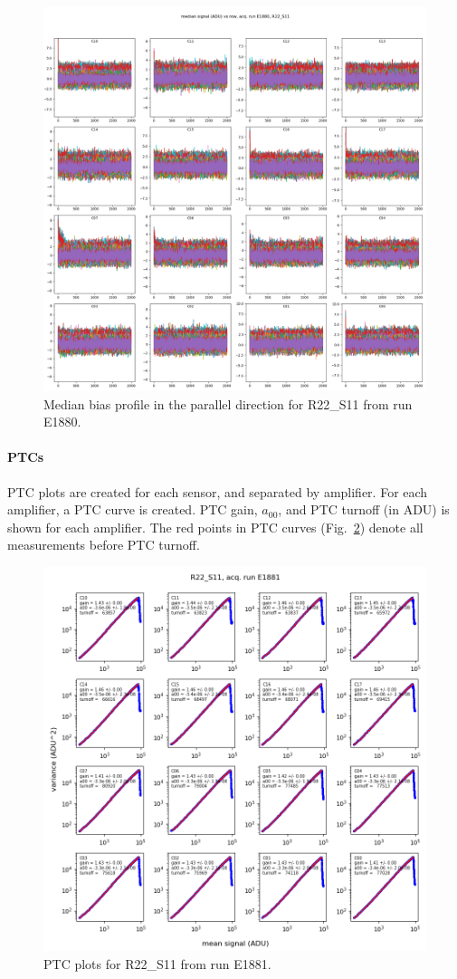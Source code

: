 \begin{figure}
    \centering
    \includegraphics[width=0.8\linewidth]{figures/ReferenceFigures/bias_parallel_profile_plots_LSSTCam_R22_S11_u_lsstccs_eo_bias_stability_E1880_w_2024_35_20241101T020021Z.png}
    \caption{Median bias profile in the parallel direction for R22\_S11 from run E1880.}
    \label{fig:ref:biasProfile}
\end{figure}
\clearpage
\paragraph{PTCs}

PTC plots are created for each sensor, and separated by amplifier. For each amplifier, a PTC curve is created. PTC gain, $a_{00}$, and PTC turnoff (in ADU) is shown for each amplifier. The red points in PTC curves (Fig.~\ref{fig:ref:PTCs}) denote all measurements before PTC turnoff.

\begin{figure}
    \centering
    \includegraphics[width=0.8\linewidth]{figures/ReferenceFigures/ptc_plots_LSSTCam_R22_S11_u_lsstccs_eo_ptc_plots_E1881_w_2024_35_20241105T131208Z.png}
    \caption{PTC plots for R22\_S11 from run E1881.}
    \label{fig:ref:PTCs}
\end{figure}
\clearpage

